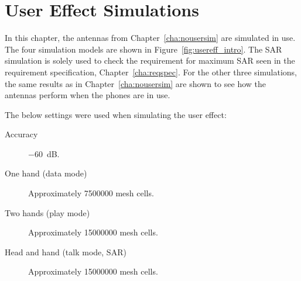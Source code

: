 \chapter{User Effect Simulations}
\label{cha:usereff}
In this chapter, the antennas from Chapter~\ref{cha:nousersim} are simulated in use.
The four simulation models are shown in Figure~\ref{fig:usereff_intro}. The SAR simulation is solely used to check the requirement for maximum SAR seen in the requirement specification, Chapter~\ref{cha:reqspec}. For the other three simulations, the same results as in Chapter~\ref{cha:nousersim} are shown to see how the antennas perform when the phones are in use.

The below settings were used when simulating the user effect:
\begin{description}
\item[Accuracy] \SI{-60}{dB}.
\item[One hand (data mode)] Approximately \num{7500000} mesh cells.
\item[Two hands (play mode)] Approximately \num{15000000} mesh cells.
\item[Head and hand (talk mode, SAR)] Approximately \num{15000000} mesh cells.
\end{description}


